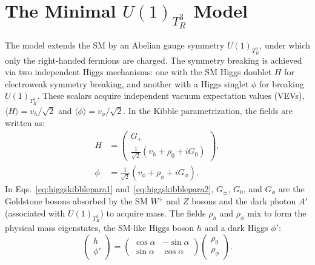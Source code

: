 \section{The Minimal $U(1)_{T_R^3}$ Model}\label{sec:model}


The model extends the SM by an Abelian gauge symmetry $U(1)_{T^3_R}$, under which only the right-handed fermions are charged. The symmetry breaking is achieved via two independent Higgs mechanisms: one with the SM Higgs doublet $H$ for electroweak symmetry breaking, and another with a Higgs singlet $\phi$ for breaking $U(1)_{T^3_R}$. These scalars acquire independent vacuum expectation values (VEVs), $\langle H \rangle = v_h / \sqrt{2}$ and $\langle \phi \rangle = v_\phi / \sqrt{2}$. In the Kibble parametrization, the fields are written as:
\begin{align}
    H & = \begin{pmatrix}
        G_{+} \\
        \frac{1}{\sqrt{2}}\left(v_h + \rho_0 + i G_{0}\right)
    \end{pmatrix}, \label{eq:higgskibblepara1} \\
    \phi & = \frac{1}{\sqrt{2}}\left(v_\phi + \rho_\phi + i G_{\phi}\right). \label{eq:higgskibblepara2}
\end{align}
In Eqs.~\eqref{eq:higgskibblepara1} and~\eqref{eq:higgskibblepara2}, $G_\pm$, $G_0$, and $G_\phi$ are the Goldstone bosons absorbed by the SM $W^\pm$ and $Z$ bosons and the dark photon $A'$ (associated with $U(1)_{T^3_R}$) to acquire mass. The fields $\rho_h$ and $\rho_\phi$ mix to form the physical mass eigenstates, the SM-like Higgs boson $h$ and a dark Higgs $\phi'$:
\begin{equation}
    \begin{pmatrix}
        h \\
        \phi'
    \end{pmatrix}
    =
    \begin{pmatrix}
        \cos\alpha & -\sin\alpha \\
        \sin\alpha & \cos\alpha
    \end{pmatrix}
    \begin{pmatrix}
        \rho_0 \\
        \rho_\phi
    \end{pmatrix}.
\end{equation}
